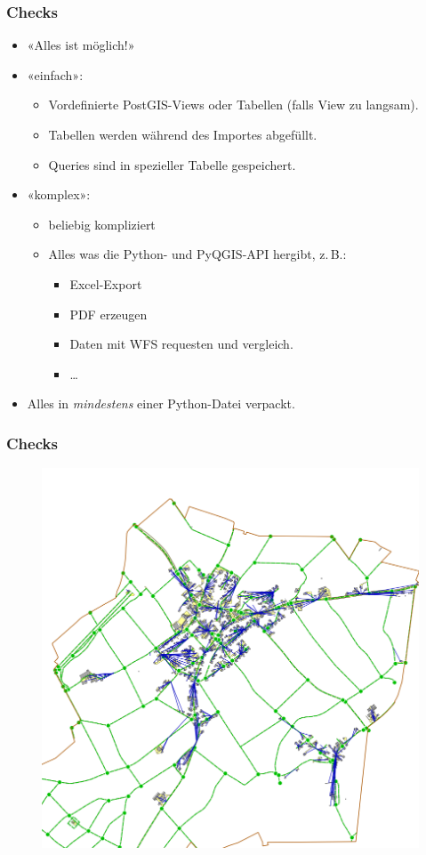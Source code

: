 \documentclass{beamer}
\begin{document}
\begin{frame}[fragile]
  \frametitle{Checks}
  \begin{itemize}
  \item «Alles ist möglich!»
  \item «einfach»:
  \begin{itemize}
   \item Vordefinierte PostGIS-Views oder Tabellen (falls View zu langsam).
   \item Tabellen werden während des Importes abgefüllt.
   \item Queries sind in spezieller Tabelle gespeichert. 
  \end{itemize}
  \item «komplex»:
  \begin{itemize}
   \item beliebig kompliziert
   \item Alles was die Python- und PyQGIS-API hergibt, z.\,B.:
   \begin{itemize}
    \item Excel-Export
    \item PDF erzeugen
    \item Daten mit WFS requesten und vergleich.
    \item \ldots
   \end{itemize}

  \end{itemize}
  
  \item Alles in \textit{mindestens} einer Python-Datei verpackt.
 \end{itemize}
\end{frame}

\begin{frame}
  \frametitle{Checks}
  \begin{figure}
    \includegraphics[scale=0.3]{bilder/veriso_spinnennetz_1.png}
  \end{figure}
\end{frame}
\end{document}
